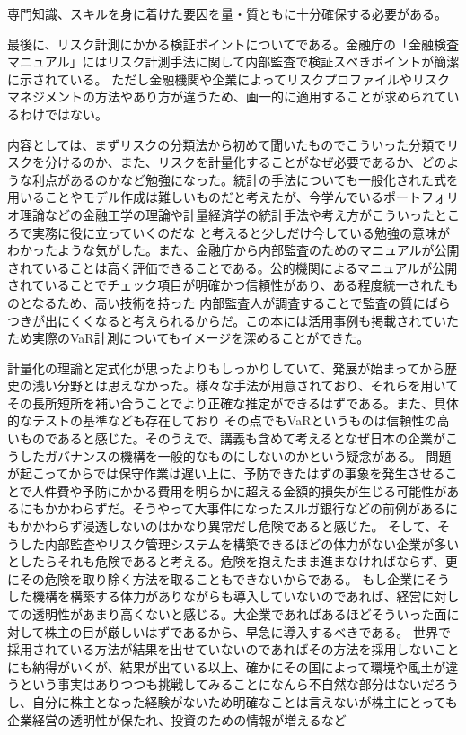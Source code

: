 \documentclass[12pt]{jsarticle}
\begin{document}
専門知識、スキルを身に着けた要因を量・質ともに十分確保する必要がある。\par 最後に、リスク計測にかかる検証ポイントについてである。金融庁の「金融検査マニュアル」にはリスク計測手法に関して内部監査で検証スべきポイントが簡潔に示されている。
ただし金融機関や企業によってリスクプロファイルやリスクマネジメントの方法やあり方が違うため、画一的に適用することが求められているわけではない。
\newpage
\par 内容としては、まずリスクの分類法から初めて聞いたものでこういった分類でリスクを分けるのか、また、リスクを計量化することがなぜ必要であるか、どのような利点があるのかなど勉強になった。統計の手法についても一般化された式を用いることやモデル作成は難しいものだと考えたが、今学んでいるポートフォリオ理論などの金融工学の理論や計量経済学の統計手法や考え方がこういったところで実務に役に立っていくのだな
と考えると少しだけ今している勉強の意味がわかったような気がした。また、金融庁から内部監査のためのマニュアルが公開されていることは高く評価できることである。公的機関によるマニュアルが公開されていることでチェック項目が明確かつ信頼性があり、ある程度統一されたものとなるため、高い技術を持った
内部監査人が調査することで監査の質にばらつきが出にくくなると考えられるからだ。この本には活用事例も掲載されていたため実際のVaR計測についてもイメージを深めることができた。
\par 計量化の理論と定式化が思ったよりもしっかりしていて、発展が始まってから歴史の浅い分野とは思えなかった。様々な手法が用意されており、それらを用いてその長所短所を補い合うことでより正確な推定ができるはずである。また、具体的なテストの基準なども存在しており
その点でもVaRというものは信頼性の高いものであると感じた。そのうえで、講義も含めて考えるとなぜ日本の企業がこうしたガバナンスの機構を一般的なものにしないのかという疑念がある。
問題が起こってからでは保守作業は遅い上に、予防できたはずの事象を発生させることで人件費や予防にかかる費用を明らかに超える金額的損失が生じる可能性があるにもかかわらずだ。そうやって大事件になったスルガ銀行などの前例があるにもかかわらず浸透しないのはかなり異常だし危険であると感じた。
そして、そうした内部監査やリスク管理システムを構築できるほどの体力がない企業が多いとしたらそれも危険であると考える。危険を抱えたまま進まなければならず、更にその危険を取り除く方法を取ることもできないからである。
もし企業にそうした機構を構築する体力がありながらも導入していないのであれば、経営に対しての透明性があまり高くないと感じる。大企業であればあるほどそういった面に対して株主の目が厳しいはずであるから、早急に導入するべきである。
世界で採用されている方法が結果を出せていないのであればその方法を採用しないことにも納得がいくが、結果が出ている以上、確かにその国によって環境や風土が違うという事実はありつつも挑戦してみることになんら不自然な部分はないだろうし、自分に株主となった経験がないため明確なことは言えないが株主にとっても企業経営の透明性が保たれ、投資のための情報が増えるなど
\end{document}
